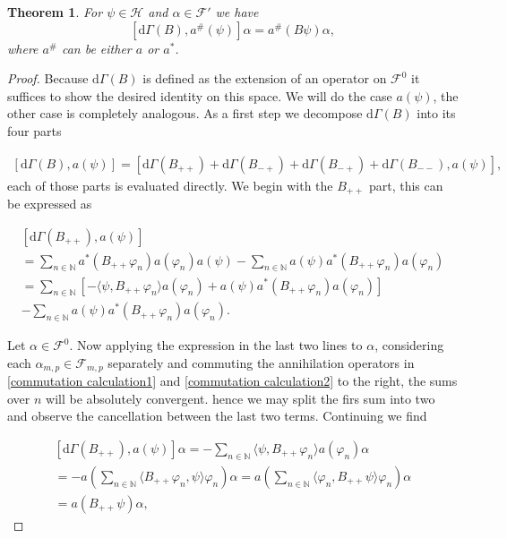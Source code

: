 \documentclass[b5paper,draft,openbib,12pt]{memoir}
\newtheorem{Thm}[Def]{Theorem}
\begin{document}
\begin{Thm}
For \(\psi \in \mathcal{H}\) and \(\alpha\in \mathcal{F}'\) we have
\begin{equation}\label{Commutation Gamma}
[\mathrm{d}\Gamma(B),a^\# (\psi)]\alpha=a^\#(B\psi)\alpha,
\end{equation}
where \(a^\#\) can be either \(a\) or \(a^*\).
\end{Thm}
\begin{proof}
Because \(\mathrm{d}\Gamma(B)\) is defined as 
the extension of an operator on \(\mathcal{F}^0\) it 
suffices to show the desired identity on this space. 
 We will do the 
case \(a(\psi)\), the other case is completely analogous.  
As a first step we decompose \(\mathrm{d}\Gamma(B)\) into its four parts

\begin{align}
\left[ \mathrm{d}\Gamma(B),a(\psi) \right] = \left[ \mathrm{d}\Gamma(B_{++})
+\mathrm{d}\Gamma(B_{-+})+\mathrm{d}\Gamma(B_{-+})+\mathrm{d}\Gamma(B_{--}),a(\psi) \right],
\end{align}
each of those parts is evaluated directly. We begin with the \(B_{++}\) part, this can be expressed as

\begin{align}
\left[ \mathrm{d}\Gamma(B_{++}),a(\psi) \right] \\
= \sum_{n\in\mathbb{N}} a^*(B_{++}\varphi_n)a(\varphi_n) a(\psi) - \sum_{n\in\mathbb{N}} a(\psi) a^*(B_{++}\varphi_n)a(\varphi_n) \\\label{commutation calculation1}
=\sum_{n\in\mathbb{N}} \left[ -\langle \psi, B_{++} \varphi_n\rangle a(\varphi_n) +a(\psi) a^*(B_{++}\varphi_n)a(\varphi_n) \right]  \\\label{commutation calculation2}
- \sum_{n\in\mathbb{N}} a(\psi) a^*(B_{++}\varphi_n)a(\varphi_n).
\end{align}

Let \(\alpha \in \mathcal{F}^0\). Now applying the expression in the last 
two lines to \(\alpha\), considering each \(\alpha_{m,p}\in\mathcal{F}_{m,p}\)
separately and commuting the annihilation operators in \eqref{commutation calculation1} 
and \eqref{commutation calculation2} 
to the right, the sums over \(n\) will be absolutely convergent. hence
we may split the firs sum into two and observe the cancellation 
between the last two terms. Continuing we find

\begin{align}
\left[ \mathrm{d}\Gamma(B_{++}),a(\psi) \right] \alpha
=-\sum_{n\in\mathbb{N}}  \langle \psi, B_{++} \varphi_n\rangle a(\varphi_n)\alpha\\
=-a\left(\sum_{n\in\mathbb{N}} \langle B_{++}\varphi_n, \psi\rangle  \varphi_n  \right)\alpha
=a\left(\sum_{n\in\mathbb{N}} \langle \varphi_n, B_{++}\psi\rangle  \varphi_n  \right)\alpha\\
=a(B_{++}\psi)\alpha,
\end{align}


\end{proof}
\end{document}
